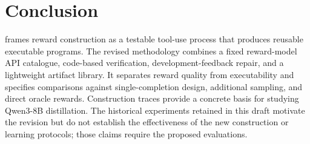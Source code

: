 \section{Conclusion}

\method{} frames reward construction as a testable tool-use process that produces reusable executable programs. The revised methodology combines a fixed reward-model API catalogue, code-based verification, development-feedback repair, and a lightweight artifact library. It separates reward quality from executability and specifies comparisons against single-completion design, additional sampling, and direct oracle rewards. Construction traces provide a concrete basis for studying Qwen3-8B distillation. The historical experiments retained in this draft motivate the revision but do not establish the effectiveness of the new construction or learning protocols; those claims require the proposed evaluations.
